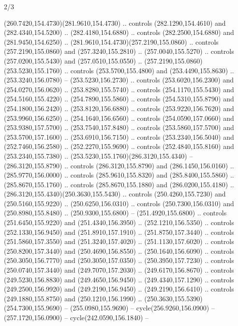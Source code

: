 \begin{flagdescription}{2/3}
\begin{scope}[xshift=0.5\flaglength,yshift=0.5\flagwidth,scale=\flagwidth/259.2]
\begin{scope}[y=0.8pt, x=0.8pt, yscale=-1,shift={(-243,-162)}]
      (260.7420,154.4730)(281.9610,154.4730) .. controls (282.1290,154.4610) and
      (282.4340,154.5200) .. (282.4180,154.6880) .. controls (282.2500,154.6880) and
      (281.9450,154.6250) .. (281.9610,154.4730)(257.2190,155.0860) .. controls
      (257.2190,155.0860) and (257.3240,155.2810) .. (257.0040,155.5270) .. controls
      (257.0200,155.5430) and (257.0510,155.0550) ..
      (257.2190,155.0860)(253.5230,155.1760) .. controls (253.5700,155.4800) and
      (253.4490,155.8630) .. (253.3240,156.0780) -- (253.5230,156.2730) .. controls
      (253.6020,156.2300) and (254.0270,156.0620) .. (253.8280,155.5740) .. controls
      (254.1170,155.5430) and (254.5160,155.4220) .. (254.7890,155.5860) .. controls
      (254.5310,155.8790) and (254.1800,156.2420) .. (253.8120,156.6880) .. controls
      (253.9220,156.7620) and (253.9960,156.6250) .. (254.1640,156.6560) .. controls
      (254.0590,157.0660) and (253.9380,157.5700) .. (253.7540,157.8480) .. controls
      (253.5860,157.5700) and (253.5700,157.1600) .. (253.6910,156.7150) .. controls
      (253.2340,156.5040) and (252.7460,156.2580) .. (252.2270,155.9690) .. controls
      (252.4840,155.8160) and (253.2340,155.7380) ..
      (253.5230,155.1760)(286.3120,155.4340) -- (286.3120,155.8790) .. controls
      (286.3120,155.8790) and (286.1450,156.0160) .. (285.9770,156.0000) .. controls
      (285.9610,155.8320) and (285.8400,155.5860) .. (285.8670,155.1760) .. controls
      (285.8670,155.1880) and (286.0200,155.4180) ..
      (286.3120,155.4340)(250.3630,155.5430) .. controls (250.4260,155.7230) and
      (250.5160,155.9220) .. (250.6250,156.0310) .. controls (250.7300,156.0310) and
      (250.8980,155.8480) .. (250.9300,155.6800) -- (251.4920,155.6800) .. controls
      (251.6450,155.9220) and (251.4340,156.3950) .. (252.1210,156.5350) .. controls
      (252.1330,156.9450) and (251.8910,157.1910) .. (251.8750,157.3440) .. controls
      (251.5860,157.3550) and (251.3240,157.4020) .. (251.1130,157.6020) .. controls
      (250.8200,157.3440) and (250.4690,156.8550) .. (250.1640,156.6090) .. controls
      (250.3050,156.7770) and (250.3050,157.0350) .. (250.3950,157.7230) .. controls
      (250.0740,157.3440) and (249.7070,157.2030) .. (249.6170,156.8670) .. controls
      (249.5230,156.8830) and (249.4650,156.9450) .. (249.4340,157.1290) .. controls
      (249.2500,156.9920) and (249.2190,156.9450) .. (249.2190,156.6410) .. controls
      (249.1880,155.8750) and (250.1210,156.1990) ..
      (250.3630,155.5390)(254.7300,155.9690) -- (255.0980,155.9690) --
      cycle(256.9260,156.0900) -- (257.1720,156.0900) -- cycle(242.0590,156.1840) --

\end{scope}
\end{scope}
\end{flagdescription}
